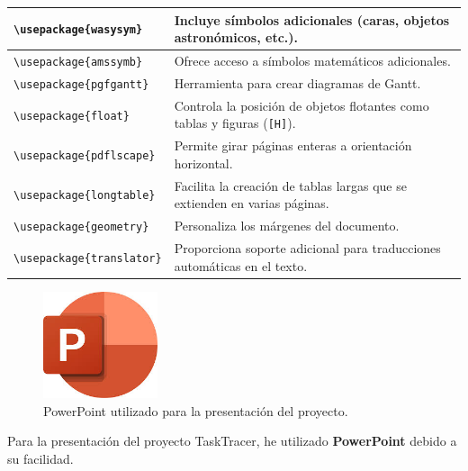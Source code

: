 \documentclass{article}
\begin{document}
\begin{flushleft}
\begin{longtable}{|p{}|p{}|}
\texttt{\textbackslash usepackage\{wasysym\}} & Incluye símbolos adicionales (caras, objetos astronómicos, etc.). \\ \hline
\texttt{\textbackslash usepackage\{amssymb\}} & Ofrece acceso a símbolos matemáticos adicionales. \\ \hline
\texttt{\textbackslash usepackage\{pgfgantt\}} & Herramienta para crear diagramas de Gantt. \\ \hline
\texttt{\textbackslash usepackage\{float\}} & Controla la posición de objetos flotantes como tablas y figuras (\texttt{[H]}). \\ \hline
\texttt{\textbackslash usepackage\{pdflscape\}} & Permite girar páginas enteras a orientación horizontal. \\ \hline
\texttt{\textbackslash usepackage\{longtable\}} & Facilita la creación de tablas largas que se extienden en varias páginas. \\ \hline
\texttt{\textbackslash usepackage\{geometry\}} & Personaliza los márgenes del documento. \\ \hline
\texttt{\textbackslash usepackage\{translator\}} & Proporciona soporte adicional para traducciones automáticas en el texto. \\ \hline
\end{longtable}

\begin{figure}[H]
    \centering
    \includegraphics[width=0.3\textwidth]{TFG/img/POWER.jpg}
    \caption{PowerPoint utilizado para la presentación del proyecto.}
    \label{fig:powerpoint}
\end{figure}

 Para la presentación del proyecto TaskTracer, he utilizado  \textbf{PowerPoint} debido a su facilidad.

 

\end{flushleft}
\end{document}
